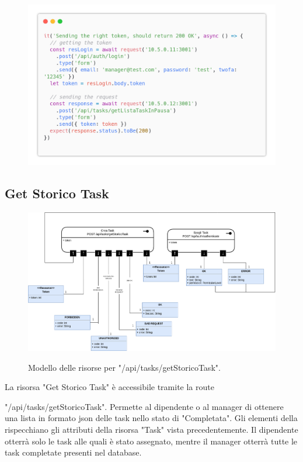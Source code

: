 \documentclass{report}
\begin{document}
\begin{figure}[H]
	\centering\includegraphics[width=1\textwidth]{images/code_in_pausa_test4.png}
\end{figure}


\subsection*{Get Storico Task}

\begin{figure}[H]
	\centering\includegraphics[width=1\textwidth]{images/model_storico_task.png}
	
	Modello delle risorse per "/api/tasks/getStoricoTask".
\end{figure}

La risorsa "Get Storico Task" è accessibile tramite la route

"/api/tasks/getStoricoTask". Permette al dipendente o al manager di ottenere una lista in formato json delle task nello stato di "Completata". Gli elementi della rispecchiano gli attributi della risorsa "Task" vista precedentemente.
Il dipendente otterrà solo le task alle quali è stato assegnato, mentre il manager otterrà tutte le task completate presenti nel database.
\end{document}
